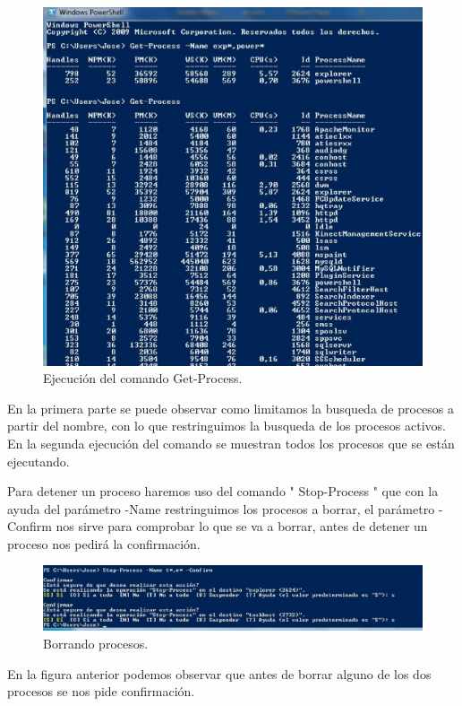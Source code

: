 \begin{figure}[H]
\begin{center}
\includegraphics[scale=0.4]{Imagenes/ejercicio19-2.eps}
\caption{Ejecución del comando Get-Process.}
\end{center}
\end{figure}
En la primera parte se puede observar como limitamos la busqueda de procesos a partir del nombre, con lo que restringuimos la busqueda de los procesos activos.
En la segunda ejecución del comando se muestran todos los procesos que se están ejecutando.

Para detener un proceso haremos uso del comando " Stop-Process " que con la ayuda del parámetro -Name restringuimos los procesos a borrar, el parámetro -Confirm  nos sirve para comprobar lo que se va a borrar, antes de detener un proceso nos pedirá la confirmación.

\begin{figure}[H]
\begin{center}
\includegraphics[scale=0.4]{Imagenes/ejercicio19-3.eps}
\caption{Borrando procesos.}
\end{center}
\end{figure}

En la figura anterior podemos observar que antes de borrar alguno de los dos procesos se nos pide confirmación.



